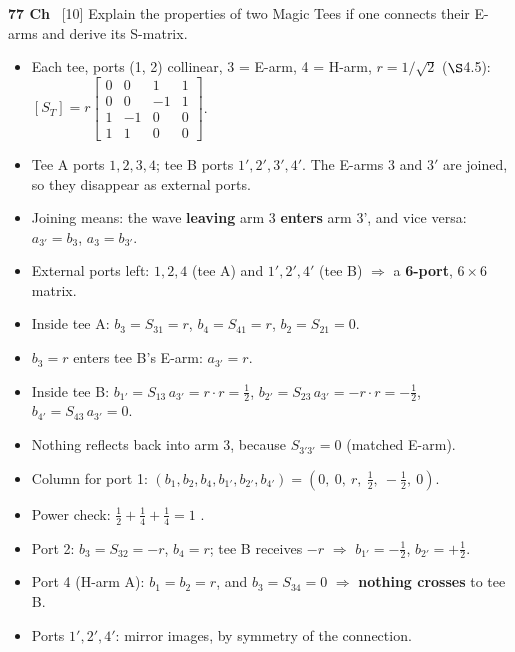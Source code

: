 \begin{asked}{\textbf{77 Ch} \ [10]}
Explain the properties of two Magic Tees if one connects their E-arms and derive its S-matrix.
\end{asked}
\begin{itemize}
  \item Each tee, ports (1, 2) collinear, 3 = E-arm, 4 = H-arm, $r = 1/\sqrt{2}$ ($\S$4.5):
    $[S_T] = r\left[\begin{smallmatrix} 0&0&1&1\\ 0&0&-1&1\\ 1&-1&0&0\\ 1&1&0&0 \end{smallmatrix}\right]$.
  \item Tee A ports $1, 2, 3, 4$; tee B ports $1', 2', 3', 4'$. The E-arms $3$ and $3'$ are
    joined, so they disappear as external ports.
  \item Joining means: the wave \textbf{leaving} arm 3 \textbf{enters} arm 3', and vice
    versa: $a_{3'} = b_3$, $a_3 = b_{3'}$.
  \item External ports left: $1, 2, 4$ (tee A) and $1', 2', 4'$ (tee B) $\Rightarrow$ a
    \textbf{6-port}, $6\times6$ matrix.
\end{itemize}
\begin{itemize}
  \item Inside tee A: $b_3 = S_{31} = r$, \quad $b_4 = S_{41} = r$, \quad $b_2 = S_{21} = 0$.
  \item $b_3 = r$ enters tee B's E-arm: $a_{3'} = r$.
  \item Inside tee B: $b_{1'} = S_{13}\,a_{3'} = r\cdot r = \tfrac{1}{2}$, \quad
    $b_{2'} = S_{23}\,a_{3'} = -r\cdot r = -\tfrac{1}{2}$, \quad
    $b_{4'} = S_{43}\,a_{3'} = 0$.
  \item Nothing reflects back into arm 3, because $S_{3'3'} = 0$ (matched E-arm).
  \item Column for port 1: $(b_1, b_2, b_4, b_{1'}, b_{2'}, b_{4'}) = (0,\ 0,\ r,\ \tfrac12,\ -\tfrac12,\ 0)$.
  \item Power check: $\tfrac12 + \tfrac14 + \tfrac14 = 1$ \checkmark.
\end{itemize}
\begin{itemize}
  \item Port 2: $b_3 = S_{32} = -r$, $b_4 = r$; tee B receives $-r$ $\Rightarrow$
    $b_{1'} = -\tfrac12$, $b_{2'} = +\tfrac12$.
  \item Port 4 (H-arm A): $b_1 = b_2 = r$, and $b_3 = S_{34} = 0$ $\Rightarrow$ \textbf{nothing
    crosses} to tee B.
  \item Ports $1', 2', 4'$: mirror images, by symmetry of the connection.
\end{itemize}
